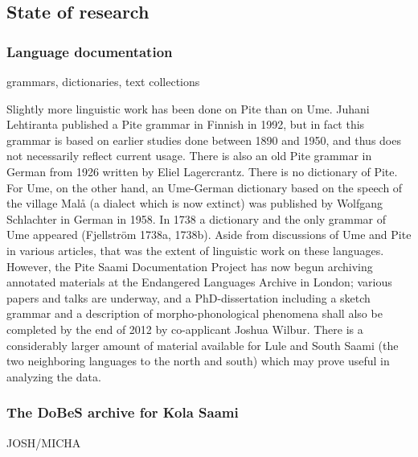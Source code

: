 \documentclass[a4paper,12pt]{article}
\begin{document}
\subsection{State of research}
\subsubsection{Language documentation}
grammars, dictionaries, text collections

Slightly more linguistic work has been done on Pite than on Ume. Juhani Lehtiranta published a Pite grammar in Finnish in 1992, but in fact this grammar is based on earlier studies done between 1890 and 1950, and thus does not necessarily reflect current usage. There is also an old Pite grammar in German from 1926 written by Eliel Lagercrantz. There is no dictionary of Pite. For Ume, on the other hand, an Ume-German dictionary based on the speech of the village Malå (a dialect which is now extinct) was published by Wolfgang Schlachter in German in 1958. In 1738 a dictionary and the only grammar of Ume appeared (Fjellström 1738a, 1738b). Aside from discussions of Ume and Pite in various articles, that was the extent of linguistic work on these languages. However, the Pite Saami Documentation Project has now begun archiving annotated materials at the Endangered Languages Archive in London; %
various papers and talks are underway, %
and a PhD-dissertation including a sketch grammar and a description of morpho-phonological phenomena shall also be completed by the end of 2012 by co-applicant Joshua Wilbur. There is a considerably larger amount of material available for Lule and South Saami (the two neighboring languages to the north and south) which may prove useful in analyzing the data.

\subsubsection{The DoBeS archive for Kola Saami}
JOSH/MICHA
\end{document}
